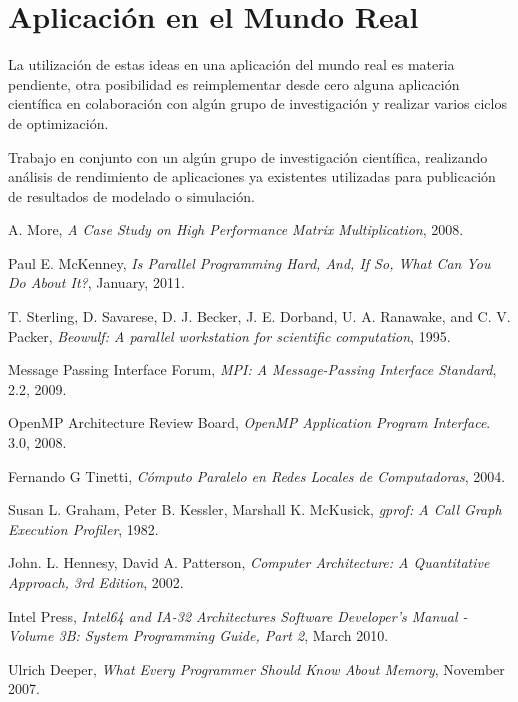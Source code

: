 \documentclass[a4paper]{report}
\begin{document}
\section{Aplicación en el Mundo Real}

La utilización de estas ideas en una aplicación del mundo real es materia
pendiente, otra posibilidad es reimplementar desde cero alguna aplicación
científica en colaboración con algún grupo de investigación y realizar
varios ciclos de optimización.

\bigskip

Trabajo en conjunto con un algún grupo de investigación científica,
realizando análisis de rendimiento de aplicaciones ya existentes utilizadas
para publicación de resultados de modelado o simulación.

\begin{thebibliography}{9}

  A. More,
  \emph{A Case Study on High Performance Matrix Multiplication},
  2008.

  Paul E. McKenney,
  \emph{Is Parallel Programming Hard, And, If So, What Can You Do About It?},
  January, 2011.

  T. Sterling, D. Savarese, D. J. Becker, J. E. Dorband, U. A. Ranawake,
  and C. V. Packer,
  \emph{Beowulf: A parallel workstation for scientific computation},
  1995.

  Message Passing Interface Forum,
  \emph{MPI: A Message-Passing Interface Standard},
  2.2,
  2009.

  OpenMP Architecture Review Board,
  \emph{OpenMP Application Program Interface}.
  3.0,
  2008.

  Fernando G Tinetti,
  \emph{Cómputo Paralelo en Redes Locales de Computadoras},
  2004.

  Susan L. Graham,  Peter B. Kessler,  Marshall K. McKusick,
  \emph{gprof: A Call Graph Execution Profiler},
  1982.
   
  John. L. Hennesy, David A. Patterson,
  \emph{Computer Architecture: A Quantitative Approach, 3rd Edition},
  2002.

  Intel Press,
  \emph{Intel64 and IA-32 Architectures Software Developer's Manual - Volume
    3B: System Programming Guide, Part 2},
  March 2010.

  Ulrich Deeper,
  \emph{What Every Programmer Should Know About Memory},
  November 2007.


\end{thebibliography}
\end{document}
